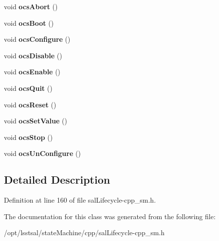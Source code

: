 \begin{DoxyCompactItemize}
\item 
\hypertarget{classcpp_context_a46d5c7cdfe2104a4a09929990271b5ce}{void {\bfseries ocs\-Abort} ()}\label{classcpp_context_a46d5c7cdfe2104a4a09929990271b5ce}

\item 
\hypertarget{classcpp_context_a2f6a93c8d0317ccaf1faff9917ec9513}{void {\bfseries ocs\-Boot} ()}\label{classcpp_context_a2f6a93c8d0317ccaf1faff9917ec9513}

\item 
\hypertarget{classcpp_context_a6d9f6c3b452dcb824e70c0a378b14d38}{void {\bfseries ocs\-Configure} ()}\label{classcpp_context_a6d9f6c3b452dcb824e70c0a378b14d38}

\item 
\hypertarget{classcpp_context_a3156786fa4068a0d28348af8548613f1}{void {\bfseries ocs\-Disable} ()}\label{classcpp_context_a3156786fa4068a0d28348af8548613f1}

\item 
\hypertarget{classcpp_context_acf20965fd63439bc72078f6e637298f4}{void {\bfseries ocs\-Enable} ()}\label{classcpp_context_acf20965fd63439bc72078f6e637298f4}

\item 
\hypertarget{classcpp_context_a7a96b0cd1d5d21fa3b3c1c753f929f87}{void {\bfseries ocs\-Quit} ()}\label{classcpp_context_a7a96b0cd1d5d21fa3b3c1c753f929f87}

\item 
\hypertarget{classcpp_context_a509ed2cb46923851b88bf1b1ce839341}{void {\bfseries ocs\-Reset} ()}\label{classcpp_context_a509ed2cb46923851b88bf1b1ce839341}

\item 
\hypertarget{classcpp_context_a862a86500937558c140208a5ecf4f676}{void {\bfseries ocs\-Set\-Value} ()}\label{classcpp_context_a862a86500937558c140208a5ecf4f676}

\item 
\hypertarget{classcpp_context_a9fe010d72b3619a80a47992d6b24a147}{void {\bfseries ocs\-Stop} ()}\label{classcpp_context_a9fe010d72b3619a80a47992d6b24a147}

\item 
\hypertarget{classcpp_context_ad7d5f0bd5a745e35e8a5b6704291b788}{void {\bfseries ocs\-Un\-Configure} ()}\label{classcpp_context_ad7d5f0bd5a745e35e8a5b6704291b788}

\end{DoxyCompactItemize}


\subsection{Detailed Description}


Definition at line 160 of file sal\-Lifecycle-\/cpp\-\_\-sm.\-h.



The documentation for this class was generated from the following file\-:\begin{DoxyCompactItemize}
\item 
/opt/lsstsal/state\-Machine/cpp/sal\-Lifecycle-\/cpp\-\_\-sm.\-h\end{DoxyCompactItemize}
